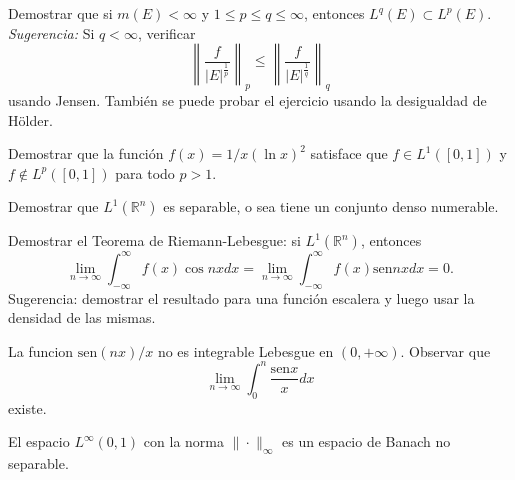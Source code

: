 \documentclass{book}
\newcommand{\rr}{\mathbb{R}}
\begin{document}
	
	
	
	\begin{ejer}{}
 Demostrar que si $m(E)<\infty$ y $1\leq p\leq q \leq \infty$, entonces 
$L^{q}(E)\subset L^{p}(E)$.
\\
{\it Sugerencia:} Si $q<\infty$, verificar 
$$\left\|\frac{f}{|E|^{\frac{1}{p}}}\right\|_p\leq
\left\|\frac{f}{|E|^{\frac{1}{q}}}\right\|_q$$
usando Jensen.
Tambi\'en se puede probar el ejercicio usando la desigualdad de H\"older.
\end{ejer}



 \begin{ejer}{}
  Demostrar que la función $f(x)=1 /x(\ln x)^2 $ satisface que $f\in L^1([0,1])$ y $f\notin L^p([0,1])$ para todo $p>1$.
  \end{ejer}
  
\begin{ejer}{}
 Demostrar que $L^1(\rr^n)$ es separable, o sea tiene un conjunto denso numerable.
\end{ejer}

\begin{ejer}{}
 Demostrar el Teorema de Riemann-Lebesgue: si  $L^1(\rr^n)$, entonces
 $$\lim_{n\to\infty}\int_{-\infty}^{\infty} f(x) \cos nx dx = \lim_{n\to\infty}\int_{-\infty}^{\infty} f(x) \text{sen} nx dx=0.$$
Sugerencia: demostrar el resultado para una función escalera y luego usar la densidad de las mismas. 
\end{ejer}

\begin{ejer}{}
La funcion $\text{sen} (nx)/x$ no es integrable Lebesgue en $(0, +\infty)$. Observar que  \[\lim_{n\to\infty} \int_0 ^n\frac{\text{sen} x}{x} dx \]
 existe.
\end{ejer}

\begin{ejer}{} El espacio $L^\infty(0, 1)$ con la norma $\|\cdot \|_\infty$ es un espacio de Banach no separable.
\end{ejer}

\end{document}
